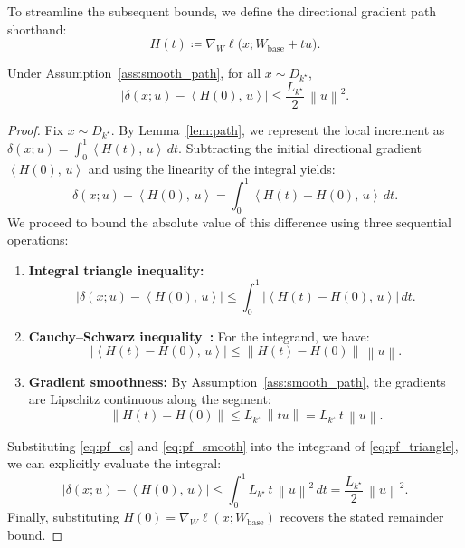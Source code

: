 \documentclass[bdcc,article,submit,pdftex]{Definitions/mdpi}
\newcommand{\ip}[2]{\left\langle #1,\,#2 \right\rangle}
\newcommand{\norm}[1]{\left\lVert #1 \right\rVert}
\newcommand{\tindex}{k^\star}
\newcommand{\utarget}{u}
\begin{document}
\noindent To streamline the subsequent bounds, we define the directional gradient path shorthand:
\begin{equation}
\label{eq:grad_shorthand}
H(t)\coloneqq \nabla_W \ell\big(x;W_{\mathrm{base}}+t\utarget\big).
\end{equation}

\begin{Lemma}
\label{lem:quad_error}
Under Assumption~\ref{ass:smooth_path}, for all $x\sim D_{\tindex}$,
\begin{equation}
\label{eq:delta_linear_bound}
\big|\delta(x;\utarget) - \ip{H(0)}{\utarget}\big|
\le \frac{L_{\tindex}}{2}\,\norm{\utarget}^2.
\end{equation}
\end{Lemma}

\begin{proof}
Fix $x\sim D_{\tindex}$.
By Lemma~\ref{lem:path}, we represent the local increment as $\delta(x;\utarget)=\int_0^1 \ip{H(t)}{\utarget}\,dt$.
Subtracting the initial directional gradient $\ip{H(0)}{\utarget}$ and using the linearity of the integral yields:
\[
\delta(x;\utarget)-\ip{H(0)}{\utarget}
=\int_0^1 \ip{H(t)-H(0)}{\utarget}\,dt.
\]
We proceed to bound the absolute value of this difference using three sequential operations:
\begin{enumerate}[leftmargin=*]
    \item \textbf{Integral triangle inequality:} 
    \begin{equation}
    \label{eq:pf_triangle}
    \Big|\delta(x;\utarget)-\ip{H(0)}{\utarget}\Big|
    \le \int_0^1 \Big|\ip{H(t)-H(0)}{\utarget}\Big|\,dt.
    \end{equation}
    
    \item \textbf{Cauchy--Schwarz inequality~\cite{steele2004cauchy}:} For the integrand, we have:
    \begin{equation}
    \label{eq:pf_cs}
    \Big|\ip{H(t)-H(0)}{\utarget}\Big|
    \le \norm{H(t)-H(0)}\,\norm{\utarget}.
    \end{equation}
    
    \item \textbf{Gradient smoothness:} By Assumption~\ref{ass:smooth_path}, the gradients are Lipschitz continuous along the segment:
    \begin{equation}
    \label{eq:pf_smooth}
    \norm{H(t)-H(0)} \le L_{\tindex}\,\norm{t\utarget}=L_{\tindex}\,t\,\norm{\utarget}.
    \end{equation}
\end{enumerate}

\noindent Substituting \eqref{eq:pf_cs} and \eqref{eq:pf_smooth} into the integrand of \eqref{eq:pf_triangle}, we can explicitly evaluate the integral:
\[
\Big|\delta(x;\utarget)-\ip{H(0)}{\utarget}\Big|
\le \int_0^1 L_{\tindex}\,t\,\norm{\utarget}^2\,dt
= \frac{L_{\tindex}}{2}\,\norm{\utarget}^2.
\]
Finally, substituting $H(0)=\nabla_W \ell(x;W_{\mathrm{base}})$ recovers the stated remainder bound.
\end{proof}
\end{document}
